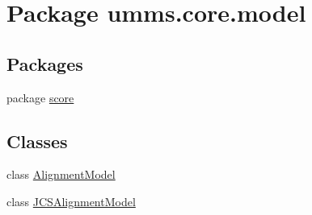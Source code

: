 \hypertarget{namespaceumms_1_1core_1_1model}{\section{Package umms.\+core.\+model}
\label{namespaceumms_1_1core_1_1model}
}
\subsection*{Packages}
\begin{DoxyCompactItemize}
\item 
package \hyperlink{namespaceumms_1_1core_1_1model_1_1score}{score}
\end{DoxyCompactItemize}
\subsection*{Classes}
\begin{DoxyCompactItemize}
\item 
class \hyperlink{classumms_1_1core_1_1model_1_1_alignment_model}{Alignment\+Model}
\item 
class \hyperlink{classumms_1_1core_1_1model_1_1_j_c_s_alignment_model}{J\+C\+S\+Alignment\+Model}
\end{DoxyCompactItemize}
